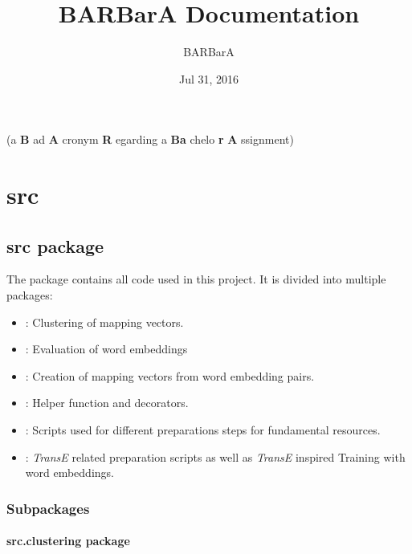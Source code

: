 \documentclass[letterpaper,10pt,english]{sphinxmanual}
\title{BARBarA Documentation}
\date{Jul 31, 2016}
\author{BARBarA}
\begin{document}
\maketitle
\tableofcontents
{}\label{index::doc}


(a \textbf{B} ad \textbf{A} cronym \textbf{R} egarding a \textbf{Ba} chelo \textbf{r} \textbf{A} ssignment)


\chapter{src}
\label{index:welcome-to-barbara-s-documentation}\label{index:src}

\section{src package}
\label{src::doc}\label{src:src-package}
The  package contains all code used in this project.
It is divided into multiple packages:
\begin{itemize}
\item {} 
: Clustering of mapping vectors.

\item {} 
: Evaluation of word embeddings

\item {} 
: Creation of mapping vectors from word embedding pairs.

\item {} 
: Helper function and decorators.

\item {} 
: Scripts used for different preparations steps for fundamental resources.

\item {} 
: \emph{TransE} related preparation scripts as well as \emph{TransE} inspired Training with word embeddings.

\end{itemize}


\subsection{Subpackages}
\label{src:subpackages}

\subsubsection{src.clustering package}
\label{src.clustering:src-clustering-package}\label{src.clustering::doc}
\end{document}
